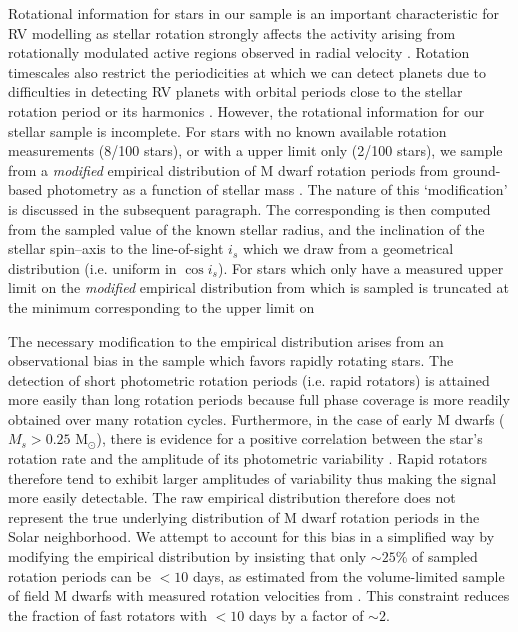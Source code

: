 Rotational information for stars in our sample is an important characteristic for RV modelling
as stellar rotation strongly affects the activity arising from rotationally modulated active
regions observed in radial velocity \citep{saar97, meunier10, aigrain12, dumusque14}.
Rotation timescales also restrict the periodicities at which we can detect planets
due to difficulties in detecting RV planets with 
orbital periods close to the stellar rotation period or its harmonics \citep{vanderburg16}. 
However, the rotational information for our stellar sample is incomplete.
For stars with no known available rotation measurements (8/100 stars),
or with a \vsini{} upper limit only (2/100 stars),
we sample \prot{} from a \emph{modified} empirical distribution of M dwarf
rotation periods from ground-based photometry as a function of stellar mass
\citep{newton16a}. The nature of this `modification' is discussed in the subsequent
paragraph. The corresponding \vsini{} is then computed
from the sampled value of \prot{,} the known stellar radius, and the
inclination of the stellar spin--axis to the line-of-sight $i_s$ which we
draw from a geometrical distribution (i.e. uniform in $\cos{i_s}$).
For stars which only have a measured upper limit on \vsini{,} 
the \emph{modified} empirical distribution from which \prot{} is sampled is
truncated at the minimum \prot{} corresponding to the upper limit on 

The necessary modification to the empirical \prot{} distribution arises from
an observational bias in the \cite{newton16a} sample which favors rapidly rotating stars.
The detection of short photometric rotation periods (i.e. rapid rotators) is attained more
easily than long rotation periods because full phase coverage is more readily obtained over many
rotation cycles. Furthermore, in the case of early M dwarfs ($M_s > 0.25$ M$_{\odot}$), 
there is evidence for a positive correlation between the star's rotation rate and the
amplitude of its photometric variability \citep{newton16a}. Rapid rotators therefore
tend to exhibit larger amplitudes of variability thus making the signal more easily detectable.
The raw empirical distribution therefore does not represent the true underlying distribution of M
dwarf rotation periods in the Solar neighborhood. We attempt to account for this bias in a simplified
way by modifying the empirical \prot{} distribution by insisting that only
$\sim 25$\% of sampled rotation periods can be $<10$ days, as estimated from the volume-limited sample
of field M dwarfs with measured rotation velocities from \cite{delfosse98}. This constraint
reduces the fraction of fast rotators with \prot{} $< 10$ days by a factor of $\sim 2$.


